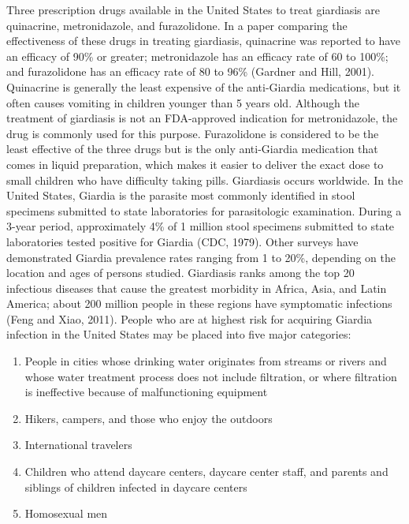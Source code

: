 \documentclass{article}
\begin{document}
Three prescription drugs available in the United States to treat
giardiasis are quinacrine, metronidazole, and furazolidone. In a paper
comparing the effectiveness of these drugs in treating giardiasis,
quinacrine was reported to have an efficacy of 90\% or greater;
metronidazole has an efficacy rate of 60 to 100\%; and furazolidone has
an efficacy rate of 80 to 96\% (Gardner and Hill, 2001). Quinacrine is
generally the least expensive of the anti-Giardia medications, but it
often causes vomiting in children younger than 5 years old. Although the
treatment of giardiasis is not an FDA-approved indication for
metronidazole, the drug is commonly used for this purpose. Furazolidone
is considered to be the least effective of the three drugs but is the
only anti-Giardia medication that comes in liquid preparation, which
makes it easier to deliver the exact dose to small children who have
difficulty taking pills. Giardiasis occurs worldwide. In the United
States, Giardia is the parasite most commonly identified in stool
specimens submitted to state laboratories for parasitologic examination.
During a 3-year period, approximately 4\% of 1 million stool specimens
submitted to state laboratories tested positive for Giardia (CDC, 1979).
Other surveys have demonstrated Giardia prevalence rates ranging from 1
to 20\%, depending on the location and ages of persons studied.
Giardiasis ranks among the top 20 infectious diseases that cause the
greatest morbidity in Africa, Asia, and Latin America; about 200 million
people in these regions have symptomatic infections (Feng and Xiao,
2011). People who are at highest risk for acquiring Giardia infection in
the United States may be placed into five major categories:

\begin{enumerate}

\item
  People in cities whose drinking water originates from streams or
  rivers and whose water treatment process does not include filtration,
  or where filtration is ineffective because of malfunctioning equipment
\item
  Hikers, campers, and those who enjoy the outdoors
\item
  International travelers
\item
  Children who attend daycare centers, daycare center staff, and parents
  and siblings of children infected in daycare centers
\item
  Homosexual men
\end{enumerate}
\end{document}
